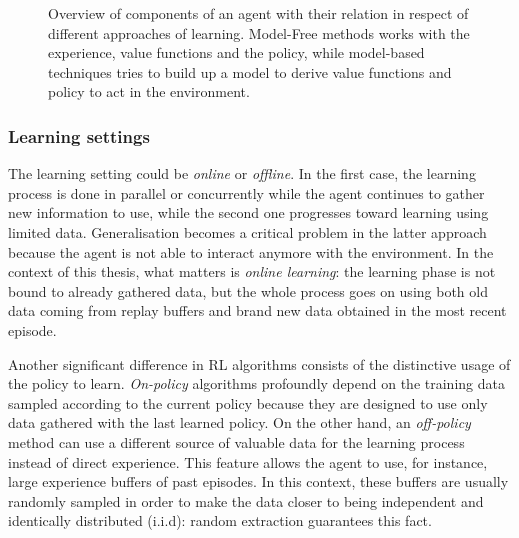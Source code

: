 \begin{figure}
	\centering
	\caption[Overview of different components in learning]{\small Overview of components of an agent with their relation in respect of different approaches of learning. Model-Free methods works with the experience, value functions and the policy, while model-based techniques tries to build up a model to derive value functions and policy to act in the environment.}
	\label{fig:components}
\end{figure}

\subsubsection{Learning settings}

The learning setting could be \textit{online} or \textit{offline}. In the first case, the learning process is done in parallel or concurrently while the agent continues to gather new information to use, while the second one progresses toward learning using limited data.
Generalisation becomes a critical problem in the latter approach because the agent is not able to interact anymore with the environment.
In the context of this thesis, what matters is \textit{online learning}: the learning phase is not bound to already gathered data, but the whole process goes on using both old data coming from replay buffers and brand new data obtained in the most recent episode.

Another significant difference in RL algorithms consists of the distinctive usage of the policy to learn.
\textit{On-policy} algorithms profoundly depend on the training data sampled according to the current policy because they are designed to use only data gathered with the last learned policy.
On the other hand, an \textit{off-policy} method can use a different source of valuable data for the learning process instead of direct experience. This feature allows the agent to use, for instance, large experience buffers of past episodes. In this context, these buffers are usually randomly sampled in order to make the data closer to being independent and identically distributed (i.i.d): random extraction guarantees this fact.



